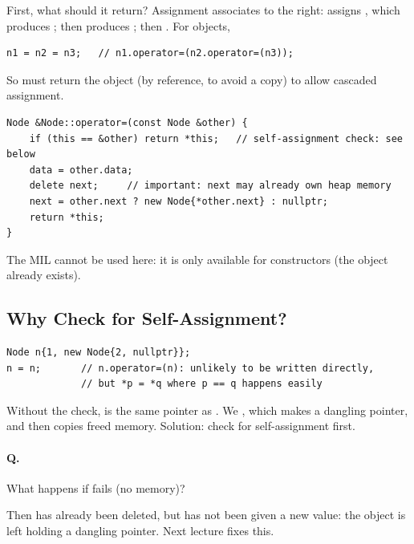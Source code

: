 First, what should it return? Assignment associates to the right:
 assigns , which produces ; then
 produces ; then . For objects,
\begin{lstlisting}[style=cpp]
n1 = n2 = n3;   // n1.operator=(n2.operator=(n3));
\end{lstlisting}
So  must return the object (by reference, to avoid a copy) to
allow cascaded assignment.

\begin{lstlisting}[style=cpp]
Node &Node::operator=(const Node &other) {
    if (this == &other) return *this;   // self-assignment check: see below
    data = other.data;
    delete next;     // important: next may already own heap memory
    next = other.next ? new Node{*other.next} : nullptr;
    return *this;
}
\end{lstlisting}
The MIL cannot be used here: it is only available for constructors (the object
already exists).

\subsection{Why Check for Self-Assignment?}
\begin{lstlisting}[style=cpp]
Node n{1, new Node{2, nullptr}};
n = n;       // n.operator=(n): unlikely to be written directly,
             // but *p = *q where p == q happens easily
\end{lstlisting}
Without the check,  is the same pointer as . We
, which makes  a dangling pointer, and then
 copies freed memory. Solution: check for
self-assignment first.

\paragraph{Q.} What happens if  fails (no memory)?

Then  has already been deleted, but has not been given a new value:
the object is left holding a dangling pointer. Next lecture fixes this.

